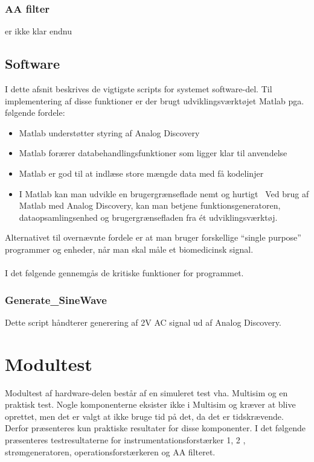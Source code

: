     
\subsection{AA filter}

er ikke klar endnu
\section{Software}

I dette afsnit beskrives de vigtigste scripts for systemet software-del. Til implementering af disse funktioner er der brugt udviklingsværktøjet Matlab pga. følgende fordele:

\begin{itemize}
\item  Matlab understøtter styring af Analog Discovery 
\item Matlab forærer databehandlingsfunktioner som ligger klar til anvendelse
\item Matlab er god til at indlæse store mængde data med få kodelinjer
\item I Matlab kan man udvikle en brugergrænseflade nemt og hurtigt 
\ Ved brug af Matlab med Analog Discovery, kan man betjene  funktionsgeneratoren, dataopsamlingsenhed og brugergrænsefladen  fra ét udviklingsværktøj.    
\end{itemize}  

Alternativet til overnævnte fordele er at man bruger forskellige “single purpose” programmer og enheder, når man skal måle et biomedicinsk signal. \\ \\
I det følgende gennemgås de kritiske funktioner for programmet.

\pagebreak
\subsection{Generate\_SineWave } 
Dette script håndterer generering af 2V AC signal ud af Analog Discovery. 


 

\chapter{Modultest}
Modultest af hardware-delen består af en simuleret test vha. Multisim og en praktisk test. Nogle komponenterne eksister ikke i Multisim og kræver at blive oprettet, men det er valgt at ikke bruge tid på det, da det er tidskrævende. Derfor præsenteres kun praktiske resultater for disse komponenter. I det følgende præsenteres testresultaterne for instrumentationsforstærker 1, 2 , strømgeneratoren, operationsforstærkeren og AA filteret. 

